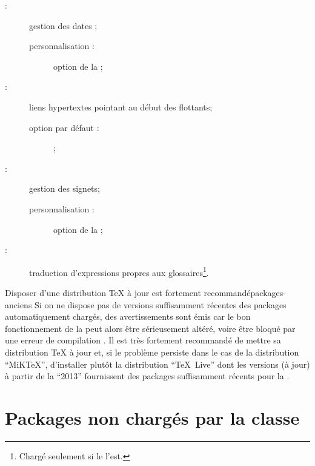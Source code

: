 \begin{description}
\item[ :] gestion des dates ;
  \begin{description}
  \item[personnalisation :] option  de la \yatcl ;
  \end{description}
\item[ :] liens hypertextes pointant au début des
  flottants\ifscreenoutput ;
  \begin{description}
  \item[option par défaut :]  ;
  \end{description}
\item[ :] gestion des signets\ifscreenoutput ;
  \begin{description}
  \item[personnalisation :] option  de la \yatcl ;
  \end{description}
\item[ :] traduction d'expressions propres aux
  glossaires\footnote{Chargé seulement si le  l'est.}.
\end{description}

\begin{dbremark}{Disposer d'une distribution \TeX{} à jour est fortement
    recommandé}{packages-anciens}
  Si on ne dispose pas de versions suffisamment récentes des packages
  automatiquement chargés, des avertissements sont émis car le bon
  fonctionnement de la \yatcl{} peut alors être sérieusement altéré, voire être
  bloqué par une erreur de compilation . Il
  est très fortement recommandé de mettre sa distribution \TeX{} à jour et, si
  le problème persiste dans le cas de la distribution \enquote{MiK\TeX{}},
  d'installer plutôt la distribution \enquote{\TeX~Live} dont les versions (à
  jour) à partir de la \enquote{2013} fournissent des packages suffisamment
  récents pour la \yatcl.
\end{dbremark}

\section{Packages non  chargés par la classe}\label{sec:packages-non-charges}

